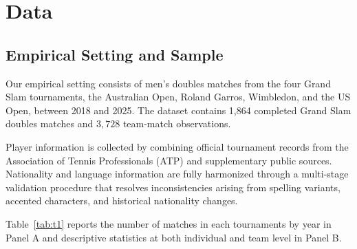 \documentclass[10pt]{article}
\begin{document}
\section{Data}
\subsection{Empirical Setting and Sample}
Our empirical setting consists of men's doubles matches from the four Grand Slam tournaments, the Australian Open, Roland Garros, Wimbledon, and the US Open, between 2018 and 2025. The dataset contains 1,864 completed Grand Slam doubles matches and $3{,}728$ team-match observations.%

Player information is collected by combining official tournament records from the Association of Tennis Professionals (ATP)  and supplementary public sources. Nationality and language information are fully harmonized through a multi-stage validation procedure that resolves inconsistencies arising from spelling variants, accented characters, and historical nationality changes. %

Table~\ref{tab:t1} reports the number of matches in each tournaments by year in Panel A and descriptive statistics at both individual and team level in Panel B. 
\end{document}

